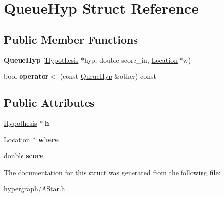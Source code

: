 \hypertarget{structQueueHyp}{
\section{QueueHyp Struct Reference}
\label{structQueueHyp}
}
\subsection*{Public Member Functions}
\begin{DoxyCompactItemize}
\item 
\hypertarget{structQueueHyp_aa884981cce7a2dedfa907e8554c56024}{
{\bfseries QueueHyp} (\hyperlink{structHypothesis}{Hypothesis} $\ast$hyp, double score\_\-in, \hyperlink{structLocation}{Location} $\ast$w)}
\label{structQueueHyp_aa884981cce7a2dedfa907e8554c56024}

\item 
\hypertarget{structQueueHyp_a09411092551d4da3aad59313c4e774dd}{
bool {\bfseries operator$<$} (const \hyperlink{structQueueHyp}{QueueHyp} \&other) const }
\label{structQueueHyp_a09411092551d4da3aad59313c4e774dd}

\end{DoxyCompactItemize}
\subsection*{Public Attributes}
\begin{DoxyCompactItemize}
\item 
\hypertarget{structQueueHyp_a7d5d6a02c85d60a166b75b796288114e}{
\hyperlink{structHypothesis}{Hypothesis} $\ast$ {\bfseries h}}
\label{structQueueHyp_a7d5d6a02c85d60a166b75b796288114e}

\item 
\hypertarget{structQueueHyp_aa1478cee47f6c454eb6d251599f5bcf6}{
\hyperlink{structLocation}{Location} $\ast$ {\bfseries where}}
\label{structQueueHyp_aa1478cee47f6c454eb6d251599f5bcf6}

\item 
\hypertarget{structQueueHyp_ac866b508946eff3c9b9a821e3747692b}{
double {\bfseries score}}
\label{structQueueHyp_ac866b508946eff3c9b9a821e3747692b}

\end{DoxyCompactItemize}


The documentation for this struct was generated from the following file:\begin{DoxyCompactItemize}
\item 
hypergraph/AStar.h\end{DoxyCompactItemize}
